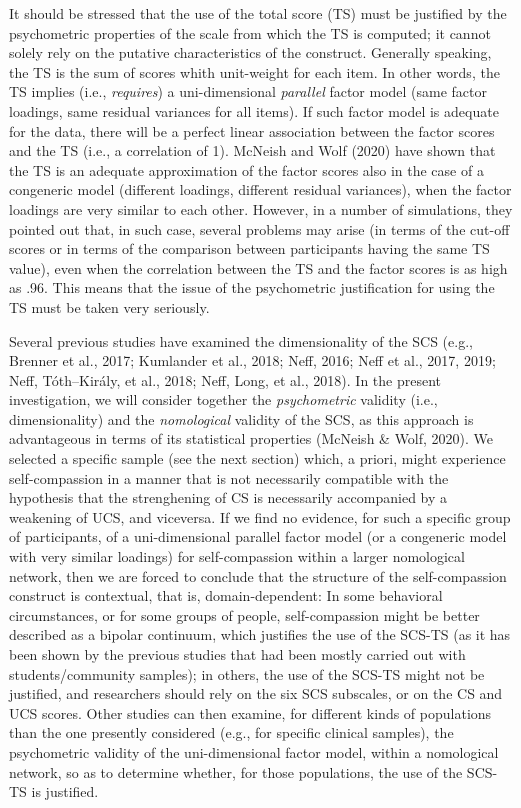 \documentclass[
  man]{apa7}
\begin{document}
It should be stressed that the use of the total score (TS) must be justified by the psychometric properties of the scale from which the TS is computed; it cannot solely rely on the putative characteristics of the construct. Generally speaking, the TS is the sum of scores whith unit-weight for each item. In other words, the TS implies (i.e., \emph{requires}) a uni-dimensional \emph{parallel} factor model (same factor loadings, same residual variances for all items). If such factor model is adequate for the data, there will be a perfect linear association between the factor scores and the TS (i.e., a correlation of 1). McNeish and Wolf (2020) have shown that the TS is an adequate approximation of the factor scores also in the case of a congeneric model (different loadings, different residual variances), when the factor loadings are very similar to each other. However, in a number of simulations, they pointed out that, in such case, several problems may arise (in terms of the cut-off scores or in terms of the comparison between participants having the same TS value), even when the correlation between the TS and the factor scores is as high as .96. This means that the issue of the psychometric justification for using the TS must be taken very seriously.

Several previous studies have examined the dimensionality of the SCS (e.g., Brenner et al., 2017; Kumlander et al., 2018; Neff, 2016; Neff et al., 2017, 2019; Neff, Tóth--Király, et al., 2018; Neff, Long, et al., 2018). In the present investigation, we will consider together the \emph{psychometric} validity (i.e., dimensionality) and the \emph{nomological} validity of the SCS, as this approach is advantageous in terms of its statistical properties (McNeish \& Wolf, 2020). We selected a specific sample (see the next section) which, a priori, might experience self-compassion in a manner that is not necessarily compatible with the hypothesis that the strenghening of CS is necessarily accompanied by a weakening of UCS, and viceversa. If we find no evidence, for such a specific group of participants, of a uni-dimensional parallel factor model (or a congeneric model with very similar loadings) for self-compassion within a larger nomological network, then we are forced to conclude that the structure of the self-compassion construct is contextual, that is, domain-dependent: In some behavioral circumstances, or for some groups of people, self-compassion might be better described as a bipolar continuum, which justifies the use of the SCS-TS (as it has been shown by the previous studies that had been mostly carried out with students/community samples); in others, the use of the SCS-TS might not be justified, and researchers should rely on the six SCS subscales, or on the CS and UCS scores. Other studies can then examine, for different kinds of populations than the one presently considered (e.g., for specific clinical samples), the psychometric validity of the uni-dimensional factor model, within a nomological network, so as to determine whether, for those populations, the use of the SCS-TS is justified.
\end{document}
